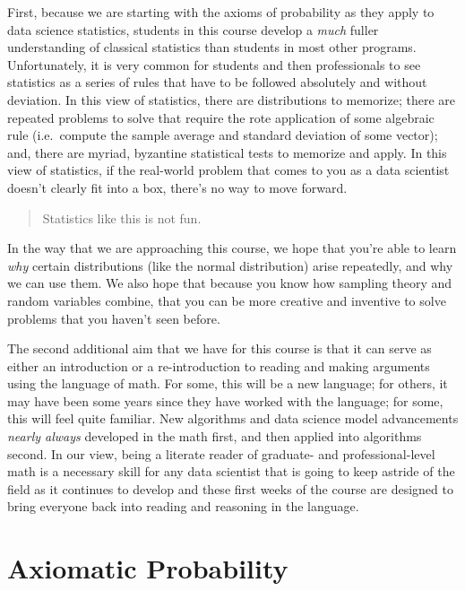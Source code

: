 \documentclass[
]{book}
\theoremstyle{definition}
\theoremstyle{definition}
\theoremstyle{definition}
\theoremstyle{definition}
\theoremstyle{remark}
\begin{document}
First, because we are starting with the axioms of probability as they apply to data science statistics, students in this course develop a \emph{much} fuller understanding of classical statistics than students in most other programs. Unfortunately, it is very common for students and then professionals to see statistics as a series of rules that have to be followed absolutely and without deviation. In this view of statistics, there are distributions to memorize; there are repeated problems to solve that require the rote application of some algebraic rule (i.e.~compute the sample average and standard deviation of some vector); and, there are myriad, byzantine statistical tests to memorize and apply. In this view of statistics, if the real-world problem that comes to you as a data scientist doesn't clearly fit into a box, there's no way to move forward.

\begin{quote}
Statistics like this is not fun.
\end{quote}

In the way that we are approaching this course, we hope that you're able to learn \emph{why} certain distributions (like the normal distribution) arise repeatedly, and why we can use them. We also hope that because you know how sampling theory and random variables combine, that you can be more creative and inventive to solve problems that you haven't seen before.

The second additional aim that we have for this course is that it can serve as either an introduction or a re-introduction to reading and making arguments using the language of math. For some, this will be a new language; for others, it may have been some years since they have worked with the language; for some, this will feel quite familiar. New algorithms and data science model advancements \emph{nearly always} developed in the math first, and then applied into algorithms second. In our view, being a literate reader of graduate- and professional-level math is a necessary skill for any data scientist that is going to keep astride of the field as it continues to develop and these first weeks of the course are designed to bring everyone back into reading and reasoning in the language.

\hypertarget{axiomatic-probability}{%
\section{Axiomatic Probability}\label{axiomatic-probability}}
\end{document}
